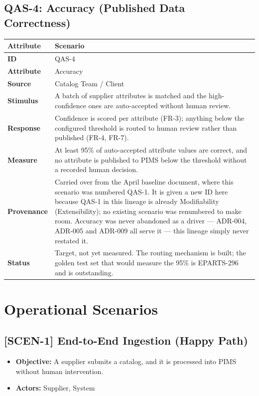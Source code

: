 \documentclass[12pt, a4paper]{article}
\begin{document}
\subsection*{QAS-4: Accuracy (Published Data Correctness)}
\begin{longtable}{@{}lp{12cm}@{}}
\toprule
\textbf{Attribute} & \textbf{Scenario} \\
\midrule
\textbf{ID} & QAS-4 \\
\textbf{Attribute} & Accuracy \\
\textbf{Source} & Catalog Team / Client \\
\textbf{Stimulus} & A batch of supplier attributes is matched and the high-confidence ones are auto-accepted without human review. \\
\textbf{Response} & Confidence is scored per attribute (FR-3); anything below the configured threshold is routed to human review rather than published (FR-4, FR-7). \\
\textbf{Measure} & At least 95\% of auto-accepted attribute values are correct, and no attribute is published to PIMS below the threshold without a recorded human decision. \\
\textbf{Provenance} & Carried over from the April baseline document, where this scenario was numbered QAS-1. It is given a new ID here because QAS-1 in this lineage is already Modifiability (Extensibility); no existing scenario was renumbered to make room. Accuracy was never abandoned as a driver --- ADR-004, ADR-005 and ADR-009 all serve it --- this lineage simply never restated it. \\
\textbf{Status} & Target, not yet measured. The routing mechanism is built; the golden test set that would measure the 95\% is EPARTS-296 and is outstanding. \\
\bottomrule
\end{longtable}

\newpage
\section{Operational Scenarios}

\subsection*{[SCEN-1] End-to-End Ingestion (Happy Path)}
\begin{itemize}
    \item \textbf{Objective:} A supplier submits a catalog, and it is processed into PIMS without human intervention.
    \item \textbf{Actors:} Supplier, System
\end{itemize}
\end{document}
